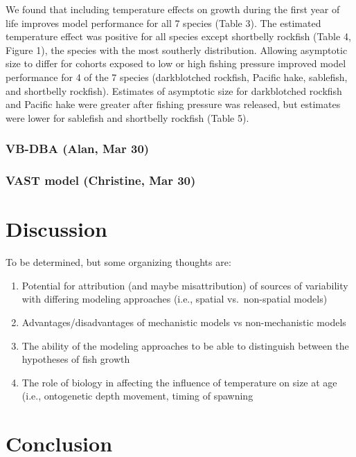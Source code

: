 \documentclass[]{article}
\begin{document}
We found that including temperature effects on growth during the first
year of life improves model performance for all 7 species (Table 3). The
estimated temperature effect was positive for all species except
shortbelly rockfish (Table 4, Figure 1), the species with the most
southerly distribution. Allowing asymptotic size to differ for cohorts
exposed to low or high fishing pressure improved model performance for 4
of the 7 species (darkblotched rockfish, Pacific hake, sablefish, and
shortbelly rockfish). Estimates of asymptotic size for darkblotched
rockfish and Pacific hake were greater after fishing pressure was
released, but estimates were lower for sablefish and shortbelly rockfish
(Table 5).

\hypertarget{vb-dba-alan-mar-30}{%
\subsubsection{VB-DBA (Alan, Mar 30)}\label{vb-dba-alan-mar-30}}

\hypertarget{vast-model-christine-mar-30}{%
\subsubsection{VAST model (Christine, Mar
30)}\label{vast-model-christine-mar-30}}

\hypertarget{discussion}{%
\section{Discussion}\label{discussion}}

To be determined, but some organizing thoughts are:

\begin{enumerate}
\def\labelenumi{\arabic{enumi})}
\item
  Potential for attribution (and maybe misattribution) of sources of
  variability with differing modeling approaches (i.e., spatial
  vs.~non-spatial models)
\item
  Advantages/disadvantages of mechanistic models vs non-mechanistic
  models
\item
  The ability of the modeling approaches to be able to distinguish
  between the hypotheses of fish growth
\item
  The role of biology in affecting the influence of temperature on size
  at age (i.e., ontogenetic depth movement, timing of spawning
\end{enumerate}

\hypertarget{conclusion}{%
\section{Conclusion}\label{conclusion}}
\end{document}
